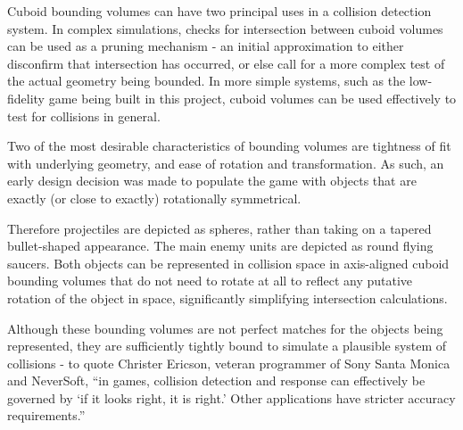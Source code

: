 \documentclass[11pt]{article}
\begin{document}
Cuboid bounding volumes can have two principal uses in a collision detection system. In complex simulations,
checks for intersection between cuboid volumes can be used as a pruning mechanism - an initial approximation
to either disconfirm that intersection has occurred, or else call for a more complex test of the actual
geometry being bounded. In more simple systems, such as the low-fidelity game being built in this project,
cuboid volumes can be used effectively to test for collisions in general.\cite[p. 75]{ericson}

Two of the most desirable characteristics of bounding volumes are tightness of fit with underlying geometry,
and ease of rotation and transformation.\cite[p. 76]{ericson} As such, an early design decision was made to
populate the game with objects that are exactly (or close to exactly) rotationally symmetrical.

Therefore projectiles are depicted as spheres, rather than taking on a tapered bullet-shaped appearance. The main
enemy units are depicted as round flying saucers. Both objects can be represented in collision space in
axis-aligned cuboid bounding volumes that do not need to rotate at all to reflect any putative rotation of
the object in space, significantly simplifying intersection calculations.

Although these bounding volumes are not perfect matches for the objects being represented, they are sufficiently
tightly bound to simulate a plausible system of collisions - to quote Christer Ericson, veteran programmer of Sony
Santa Monica and NeverSoft, ``in games, collision detection and response can effectively be governed by `if it looks
right, it is right.' Other applications have stricter accuracy requirements.''\cite[p. 12]{ericson}
\end{document}
